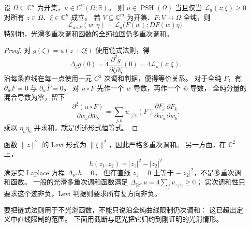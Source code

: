 \begin{proposition}[光滑判据与链式法则]\label{b3:prop:29-levi-criterion}
设 \(\Omega\subseteq\mathbb C^n\) 为开集，\(u\in C^2(\Omega;\mathbb R)\)。
则 \(u\in\operatorname{PSH}(\Omega)\) 当且仅当
\(\mathcal L_u(z;\xi)\ge0\) 对所有 \(z\in\Omega\)、\(\xi\in\mathbb C^n\) 成立。
若 \(V\subseteq\mathbb C^m\) 为开集、\(F:V\to\Omega\) 全纯，则
\[
 \mathcal L_{u\circ F}(w;\eta)
 =\mathcal L_u\bigl(F(w);DF(w)\eta\bigr).
\]
特别地，光滑多重次调和函数的全纯拉回仍多重次调和。
\end{proposition}
\begin{proof}
对 \(g(\zeta)=u(z+\zeta\xi)\) 使用链式法则，得
\[
 \Delta_\zeta g(0)
 =4\frac{\partial^2g}{\partial\zeta\partial\bar\zeta}(0)
 =4\mathcal L_u(z;\xi).
\]
沿每条直线在每一点使用一元 \(C^2\) 次调和判据，便得等价关系。
对于全纯 \(F\)，有 \(\partial_{\bar w}F=0\) 与
\(\partial_w\overline F=0\)。
对 \(u\circ F\) 先作一个 \(w\) 导数，再作一个 \(\bar w\) 导数，
全纯分量的混合导数为零，留下
\[
 \frac{\partial^2(u\circ F)}{\partial w_a\partial\bar w_b}
 =\sum_{j,k}u_{z_j\bar z_k}(F)
             \frac{\partial F_j}{\partial w_a}
             \overline{\frac{\partial F_k}{\partial w_b}}.
\]
乘以 \(\eta_a\overline{\eta_b}\) 并求和，就是所述形式恒等式。
\end{proof}

函数 \(\|z\|^2\) 的 Levi 形式为 \(\|\xi\|^2\)，因此严格多重次调和。
另一方面，在 \(\mathbb C^2\) 上，
\[
 h(z_1,z_2)=|z_1|^2-|z_2|^2
\]
满足实 Laplace 方程 \(\Delta_{\mathbb R^4}h=0\)，
但在直线 \(z_1=0\) 上等于 \(-|z_2|^2\)，不是多重次调和函数。
一般的光滑多重次调和函数满足
\(\Delta_{\mathbb R^{2n}}u=4\sum_j u_{z_j\bar z_j}\ge0\)；
实次调和性只要求这个迹非负，Levi 判据则要求所有复方向非负。

\ProseParagraphBreak
要把链式法则用于不光滑函数，不能只说沿全纯曲线限制仍次调和：
这已超出定义中直线限制的范围。
下面用截断与磨光把它归约到刚证明的光滑情形。

